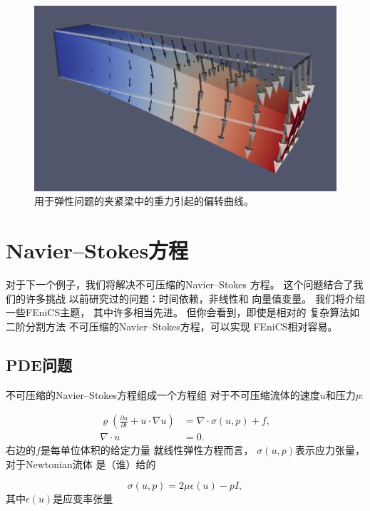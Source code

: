 \begin{figure}[!ht]  %
  \centerline{\includegraphics[width=0.95\linewidth]{fig/elasticity.png}}
  \caption{
  用于弹性问题的夹紧梁中的重力引起的偏转曲线。
  }
\end{figure}

\section{Navier--Stokes方程}
\label{ftut1:NS}


对于下一个例子，我们将解决不可压缩的Navier--Stokes
方程。 这个问题结合了我们的许多挑战
以前研究过的问题：时间依赖，非线性和
向量值变量。 我们将介绍一些FEniCS主题，
其中许多相当先进。 但你会看到，即使是相对的
复杂算法如二阶分割方法
不可压缩的Navier--Stokes方程，可以实现
FEniCS相对容易。

\subsection{PDE问题}

不可压缩的Navier--Stokes方程组成一个方程组
对于不可压缩流体的速度$u$和压力$p$:

\begin{align}
  \label{ftut1:ns:momentum}
  \varrho\left(\frac{\partial u}{\partial t} +
  u \cdot \nabla u\right) &= \nabla\cdot\sigma(u, p) + f, \\
  \label{ftut1:ns:continuity}
  \nabla \cdot u &= 0.
\end{align}
右边的$f$是每单位体积的给定力量
就线性弹性方程而言，
$\sigma(u,p)$表示应力张量，对于Newtonian流体
是（谁）给的


\begin{equation}
  \sigma(u, p) = 2\mu\epsilon(u) - pI,
\end{equation}
其中$\epsilon(u)$是应变率张量

